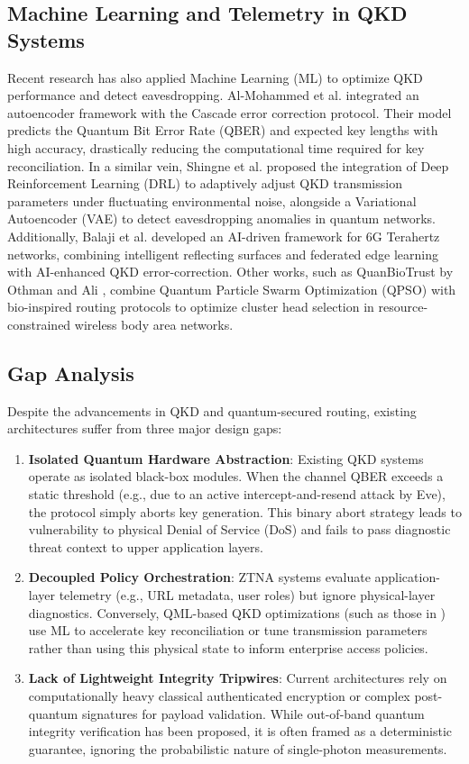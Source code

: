 \documentclass[conference]{IEEEtran}
\begin{document}
\subsection{Machine Learning and Telemetry in QKD Systems}
Recent research has also applied Machine Learning (ML) to optimize QKD performance and detect eavesdropping. Al-Mohammed et al. \cite{almohammed2024} integrated an autoencoder framework with the Cascade error correction protocol. Their model predicts the Quantum Bit Error Rate (QBER) and expected key lengths with high accuracy, drastically reducing the computational time required for key reconciliation. In a similar vein, Shingne et al. \cite{shingne2025} proposed the integration of Deep Reinforcement Learning (DRL) to adaptively adjust QKD transmission parameters under fluctuating environmental noise, alongside a Variational Autoencoder (VAE) to detect eavesdropping anomalies in quantum networks. Additionally, Balaji et al. \cite{balaji2025} developed an AI-driven framework for 6G Terahertz networks, combining intelligent reflecting surfaces and federated edge learning with AI-enhanced QKD error-correction. Other works, such as QuanBioTrust by Othman and Ali \cite{othman2025}, combine Quantum Particle Swarm Optimization (QPSO) with bio-inspired routing protocols to optimize cluster head selection in resource-constrained wireless body area networks.

\subsection{Gap Analysis}
Despite the advancements in QKD and quantum-secured routing, existing architectures suffer from three major design gaps:
\begin{enumerate}
    \item \textbf{Isolated Quantum Hardware Abstraction}: Existing QKD systems operate as isolated black-box modules. When the channel QBER exceeds a static threshold (e.g., due to an active intercept-and-resend attack by Eve), the protocol simply aborts key generation. This binary abort strategy leads to vulnerability to physical Denial of Service (DoS) and fails to pass diagnostic threat context to upper application layers.
    \item \textbf{Decoupled Policy Orchestration}: ZTNA systems evaluate application-layer telemetry (e.g., URL metadata, user roles) but ignore physical-layer diagnostics. Conversely, QML-based QKD optimizations (such as those in \cite{almohammed2024, shingne2025}) use ML to accelerate key reconciliation or tune transmission parameters rather than using this physical state to inform enterprise access policies.
    \item \textbf{Lack of Lightweight Integrity Tripwires}: Current architectures rely on computationally heavy classical authenticated encryption or complex post-quantum signatures for payload validation. While out-of-band quantum integrity verification has been proposed, it is often framed as a deterministic guarantee, ignoring the probabilistic nature of single-photon measurements.
\end{enumerate}
\end{document}
